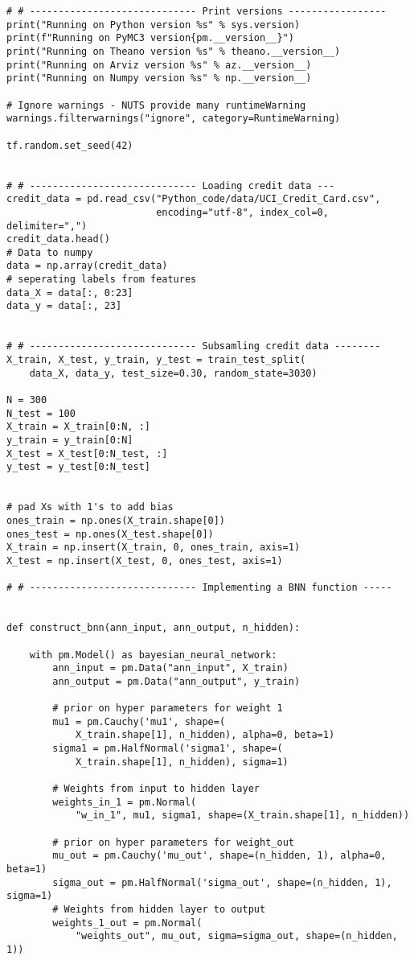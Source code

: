 \begin{appendices}
\begin{lstlisting}
# # ----------------------------- Print versions -----------------
print("Running on Python version %s" % sys.version)
print(f"Running on PyMC3 version{pm.__version__}")
print("Running on Theano version %s" % theano.__version__)
print("Running on Arviz version %s" % az.__version__)
print("Running on Numpy version %s" % np.__version__)

# Ignore warnings - NUTS provide many runtimeWarning
warnings.filterwarnings("ignore", category=RuntimeWarning)

tf.random.set_seed(42)


# # ----------------------------- Loading credit data ---
credit_data = pd.read_csv("Python_code/data/UCI_Credit_Card.csv",
                          encoding="utf-8", index_col=0, delimiter=",")
credit_data.head()
# Data to numpy
data = np.array(credit_data)
# seperating labels from features
data_X = data[:, 0:23]
data_y = data[:, 23]


# # ----------------------------- Subsamling credit data --------
X_train, X_test, y_train, y_test = train_test_split(
    data_X, data_y, test_size=0.30, random_state=3030)

N = 300
N_test = 100
X_train = X_train[0:N, :]
y_train = y_train[0:N]
X_test = X_test[0:N_test, :]
y_test = y_test[0:N_test]


# pad Xs with 1's to add bias
ones_train = np.ones(X_train.shape[0])
ones_test = np.ones(X_test.shape[0])
X_train = np.insert(X_train, 0, ones_train, axis=1)
X_test = np.insert(X_test, 0, ones_test, axis=1)

# # ----------------------------- Implementing a BNN function -----


def construct_bnn(ann_input, ann_output, n_hidden):

    with pm.Model() as bayesian_neural_network:
        ann_input = pm.Data("ann_input", X_train)
        ann_output = pm.Data("ann_output", y_train)

        # prior on hyper parameters for weight 1
        mu1 = pm.Cauchy('mu1', shape=(
            X_train.shape[1], n_hidden), alpha=0, beta=1)
        sigma1 = pm.HalfNormal('sigma1', shape=(
            X_train.shape[1], n_hidden), sigma=1)

        # Weights from input to hidden layer
        weights_in_1 = pm.Normal(
            "w_in_1", mu1, sigma1, shape=(X_train.shape[1], n_hidden))

        # prior on hyper parameters for weight_out
        mu_out = pm.Cauchy('mu_out', shape=(n_hidden, 1), alpha=0, beta=1)
        sigma_out = pm.HalfNormal('sigma_out', shape=(n_hidden, 1), sigma=1)
        # Weights from hidden layer to output
        weights_1_out = pm.Normal(
            "weights_out", mu_out, sigma=sigma_out, shape=(n_hidden, 1))


\end{lstlisting}
\end{appendices}
